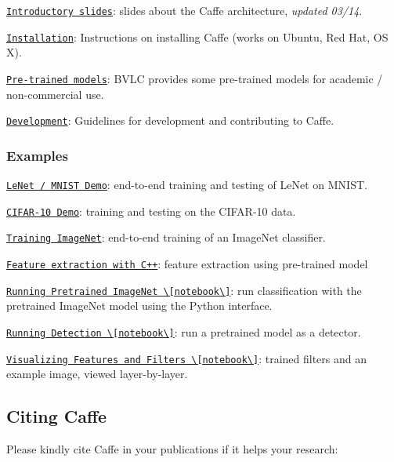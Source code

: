 \begin{DoxyItemize}
\item \href{https://www.dropbox.com/s/10fx16yp5etb8dv/caffe-presentation.pdf}{\tt Introductory slides}\+: slides about the Caffe architecture, {\itshape updated 03/14}.
\item \href{/installation.html}{\tt Installation}\+: Instructions on installing Caffe (works on Ubuntu, Red Hat, O\+S X).
\item \href{/getting_pretrained_models.html}{\tt Pre-\/trained models}\+: B\+V\+L\+C provides some pre-\/trained models for academic / non-\/commercial use.
\item \href{/development.html}{\tt Development}\+: Guidelines for development and contributing to Caffe.
\end{DoxyItemize}

\subsubsection*{Examples}


\begin{DoxyItemize}
\item \href{/mnist.html}{\tt Le\+Net / M\+N\+I\+S\+T Demo}\+: end-\/to-\/end training and testing of Le\+Net on M\+N\+I\+S\+T.
\item \href{/cifar10.html}{\tt C\+I\+F\+A\+R-\/10 Demo}\+: training and testing on the C\+I\+F\+A\+R-\/10 data.
\item \href{/imagenet_training.html}{\tt Training Image\+Net}\+: end-\/to-\/end training of an Image\+Net classifier.
\item \href{/feature_extraction.html}{\tt Feature extraction with C++}\+: feature extraction using pre-\/trained model
\item \href{http://nbviewer.ipython.org/github/BVLC/caffe/blob/master/examples/imagenet_pretrained.ipynb}{\tt Running Pretrained Image\+Net \textbackslash{}\mbox{[}notebook\textbackslash{}\mbox{]}}\+: run classification with the pretrained Image\+Net model using the Python interface.
\item \href{http://nbviewer.ipython.org/github/BVLC/caffe/blob/master/examples/selective_search_demo.ipynb}{\tt Running Detection \textbackslash{}\mbox{[}notebook\textbackslash{}\mbox{]}}\+: run a pretrained model as a detector.
\item \href{http://nbviewer.ipython.org/github/BVLC/caffe/blob/master/examples/filter_visualization.ipynb}{\tt Visualizing Features and Filters \textbackslash{}\mbox{[}notebook\textbackslash{}\mbox{]}}\+: trained filters and an example image, viewed layer-\/by-\/layer.
\end{DoxyItemize}

\subsection*{Citing Caffe}

Please kindly cite Caffe in your publications if it helps your research\+: 